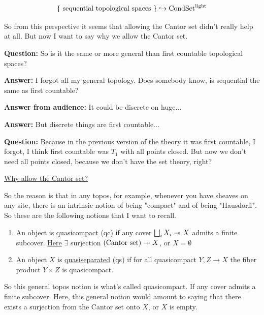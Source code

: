 \begin{align*}
\{ \text{ sequential topological spaces } \} \hookrightarrow \mathrm{Cond}\mathrm{Set}^{\mathrm{light}} 
\end{align*}

So from this perspective it seems that allowing the Cantor set didn't really help at all. But now I want to say why we allow the Cantor set. 

\textbf{Question:} So is it the same or more general than first countable topological spaces? 

\textbf{Answer:} I forgot all my general topology. Does somebody know, is sequential the same as first countable? 

\textbf{Answer from audience:} It could be discrete on huge...

\textbf{Answer:} But discrete things are first countable... 

\textbf{Question:} Because in the previous version of the theory it was first countable, I forgot, I think first countable was $T_1$ with all points closed. But now we don't need all points closed, because we don't have the set theory, right?

\underline{Why allow the Cantor set?}

So the reason is that in any topos, for example, whenever you have sheaves on any site, there is an intrinsic notion of being "compact" and of being "Hausdorff". So these are the following notions that I want to recall.

\begin{definition}

\begin{enumerate}
\item An object is \underline{quasicompact} (qc) if any cover $\bigsqcup_i X_i \twoheadrightarrow X$ admits a finite subcover. \underline{Here} $\exists$ surjection $\text{(Cantor set)} \twoheadrightarrow X$, or $X = \emptyset$ 
\item An object $X$ is \underline{quasiseparated} (qs) if for all quasicompact $Y, Z \to X$ the fiber product $Y \times Z$ is quasicompact. 
\end{enumerate}

\end{definition}

So this general topos notion is what's called quasicompact. If any cover admits a finite subcover. Here, this general notion would amount to saying that there exists a surjection from the Cantor set onto $X$, or $X$ is empty. 

